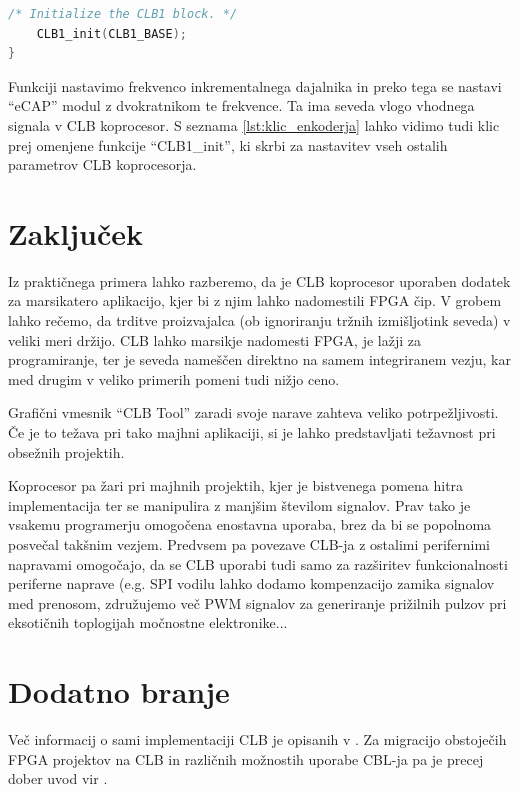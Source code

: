 \documentclass[a4paper]{article}
\begin{document}
\begin{sloppypar}
\begin{lstlisting}[language=C,
                   caption={Implementacija funkcije za nastavitev 
                            inkrementalnega dajalnika},
                   label={lst:klic_enkoderja}]
    /* Initialize the CLB1 block. */
    CLB1_init(CLB1_BASE);
}
\end{lstlisting}

Funkciji nastavimo frekvenco inkrementalnega dajalnika in preko tega se nastavi
``eCAP'' modul z dvokratnikom te frekvence. Ta ima seveda vlogo vhodnega
signala v CLB koprocesor. S seznama \ref{lst:klic_enkoderja} lahko vidimo tudi
klic prej omenjene funkcije ``CLB1\_init'', ki skrbi za nastavitev vseh ostalih
parametrov CLB koprocesorja.


\section{Zaključek}
Iz praktičnega primera lahko razberemo, da je CLB koprocesor uporaben
dodatek za marsikatero aplikacijo, kjer bi z njim lahko nadomestili FPGA čip. V
grobem lahko rečemo, da trditve proizvajalca (ob ignoriranju tržnih
izmišljotink seveda) v veliki meri držijo. CLB lahko marsikje nadomesti FPGA,
je lažji za programiranje, ter je seveda nameščen direktno na samem
integriranem vezju, kar med drugim v veliko primerih pomeni tudi nižjo ceno.

Grafični vmesnik ``CLB Tool'' zaradi svoje narave zahteva veliko
potrpežljivosti. Če je to težava pri tako majhni aplikaciji, si je lahko
predstavljati težavnost pri obsežnih projektih.

Koprocesor pa žari pri majhnih projektih, kjer je bistvenega pomena hitra
implementacija ter se manipulira z manjšim številom signalov. Prav tako je
vsakemu programerju omogočena enostavna uporaba, brez da bi se popolnoma
posvečal takšnim vezjem. Predvsem pa povezave CLB-ja z ostalimi perifernimi
napravami \cite{fpga-to-clb} omogočajo, da se CLB uporabi tudi samo za
razširitev funkcionalnosti periferne naprave (e.g. SPI vodilu lahko dodamo
kompenzacijo zamika signalov med prenosom, združujemo več PWM signalov za
generiranje prižilnih pulzov pri eksotičnih toplogijah močnostne elektronike...


\section{Dodatno branje}
Več informacij o sami implementaciji CLB je opisanih v \cite{clb-designing}. Za
migracijo obstoječih FPGA projektov na CLB in različnih možnostih uporabe
CBL-ja pa je precej dober uvod vir \cite{fpga-to-clb}.


\printbibliography


\end{sloppypar}
\end{document}
